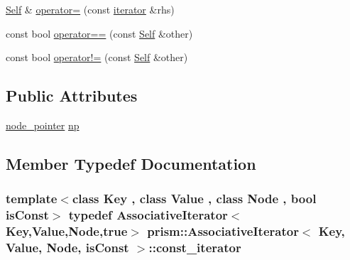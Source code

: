\begin{DoxyCompactItemize}
\item 
\hyperlink{structprism_1_1_associative_iterator_af8bb51b69b4eca7c0ec7ba4887833877}{Self} \& \hyperlink{structprism_1_1_associative_iterator_a1ff6e793e83d8008121ebd5d864a43d8}{operator=} (const \hyperlink{structprism_1_1_associative_iterator_a1c18ef8b4a02324bfdbf541b023ecc6b}{iterator} \&rhs)
\item 
const bool \hyperlink{structprism_1_1_associative_iterator_a4bc7b60448c2a982b29f0742218271bb}{operator==} (const \hyperlink{structprism_1_1_associative_iterator_af8bb51b69b4eca7c0ec7ba4887833877}{Self} \&other)
\item 
const bool \hyperlink{structprism_1_1_associative_iterator_aa697ef95776d617daa0a87e7ec96e624}{operator!=} (const \hyperlink{structprism_1_1_associative_iterator_af8bb51b69b4eca7c0ec7ba4887833877}{Self} \&other)
\end{DoxyCompactItemize}
\subsection*{Public Attributes}
\begin{DoxyCompactItemize}
\item 
\hyperlink{structprism_1_1_associative_iterator_a73a0ddce41b285bf48fb0ef3411f6557}{node\+\_\+pointer} \hyperlink{structprism_1_1_associative_iterator_a5a71d66646a56ad2d60e2db2b881061b}{np}
\end{DoxyCompactItemize}


\subsection{Member Typedef Documentation}
\subsubsection[{\texorpdfstring{const\+\_\+iterator}{const_iterator}}]{\setlength{\rightskip}{0pt plus 5cm}template$<$class Key , class Value , class Node , bool is\+Const$>$ typedef {\bf Associative\+Iterator}$<$Key,Value,Node,true$>$ {\bf prism\+::\+Associative\+Iterator}$<$ Key, Value, Node, is\+Const $>$\+::{\bf const\+\_\+iterator}}\hypertarget{structprism_1_1_associative_iterator_ab372de0dedeecc03d00f577af3380ef2}{}\label{structprism_1_1_associative_iterator_ab372de0dedeecc03d00f577af3380ef2}
